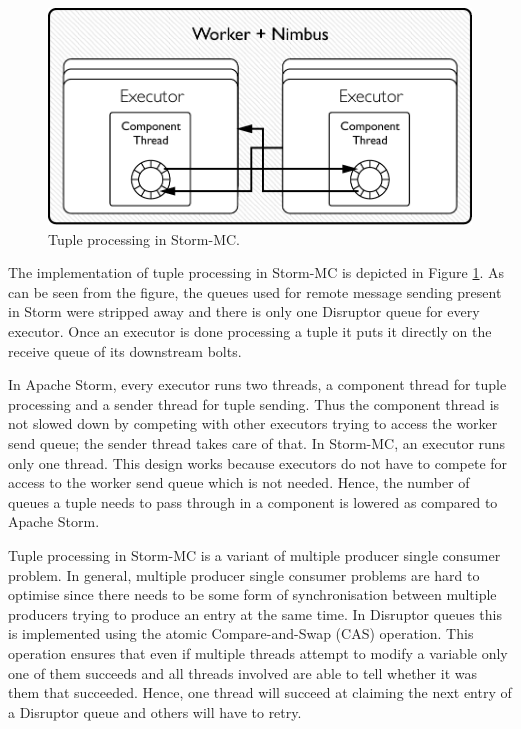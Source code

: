 \begin{figure}[!htb]
	\centering
	\includegraphics[scale=0.7]{pdf/worker_inside_mc.pdf}
	\caption{Tuple processing in Storm-MC.}
	\label{fig:worker_inside_mc}
\end{figure}

The implementation of tuple processing in Storm-MC is depicted in Figure \ref{fig:worker_inside_mc}. As can be seen from the figure, the queues used for remote message sending present in Storm were stripped away and there is only one Disruptor queue for every executor. Once an executor is done processing a tuple it puts it directly on the receive queue of its downstream bolts.

In Apache Storm, every executor runs two threads, a component thread for tuple processing and a sender thread for tuple sending. Thus the component thread is not slowed down by competing with other executors trying to access the worker send queue; the sender thread takes care of that. In Storm-MC, an executor runs only one thread. This design works because executors do not have to compete for access to the worker send queue which is not needed. Hence, the number of queues a tuple needs to pass through in a component is lowered as compared to Apache Storm.

Tuple processing in Storm-MC is a variant of multiple producer single consumer problem. In general, multiple producer single consumer problems are hard to optimise since there needs to be some form of synchronisation between multiple producers trying to produce an entry at the same time. In Disruptor queues this is implemented using the atomic Compare-and-Swap (CAS) operation. This operation ensures that even if multiple threads attempt to modify a variable only one of them succeeds and all threads involved are able to tell whether it was them that succeeded. Hence, one thread will succeed at claiming the next entry of a Disruptor queue and others will have to retry.

